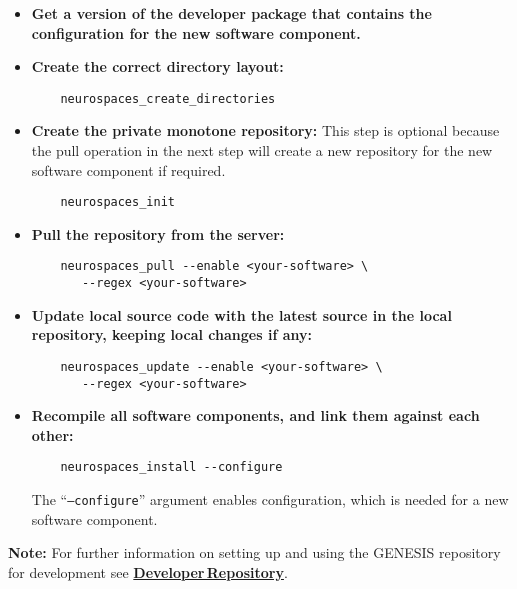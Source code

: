 \documentclass[12pt]{article}
\begin{document}
\begin{itemize}

\item {\bf Get a version of the developer package that contains the
    configuration for the new software component.}
  
\item {\bf Create the correct directory layout:}
\begin{verbatim}
	neurospaces_create_directories
\end{verbatim}

\item {\bf Create the private monotone repository:} This step is
  optional because the pull operation in the next step will create a
  new repository for the new software component if required.
\begin{verbatim}
	neurospaces_init
\end{verbatim}

\item {\bf Pull the repository from the server:}
\begin{verbatim}
	neurospaces_pull --enable <your-software> \
	   --regex <your-software>
\end{verbatim}
  
\item {\bf Update local source code with the latest source in the
    local repository, keeping local changes if any:}
\begin{verbatim}
	neurospaces_update --enable <your-software> \
	   --regex <your-software>
\end{verbatim}
  
\item {\bf Recompile all software components, and link them against
    each other:}
\begin{verbatim}
	neurospaces_install --configure
\end{verbatim}
  The ``{\tt --configure}'' argument enables configuration, which is
  needed for a new software component.
\end{itemize}

{\bf Note:} For further information on setting up and using the GENESIS repository for development see \href{../developer-repository/developer-repository.tex}{\bf Developer\,Repository}.
\end{document}
